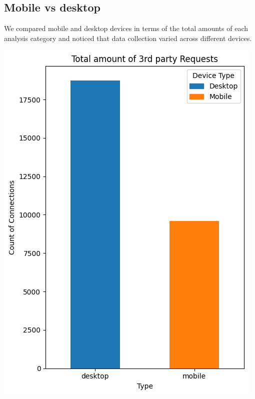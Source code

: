 \subsection{Mobile vs desktop}
We compared mobile and desktop devices in terms of the total amounts of each analysis category and noticed that data collection varied across different devices.

\vspace{0.8cm}
\noindent 
\begin{minipage}{0.35\textwidth} 
    \includegraphics[width=\linewidth]{./assets/comparison5.png} 
\end{minipage}
\hfill 
